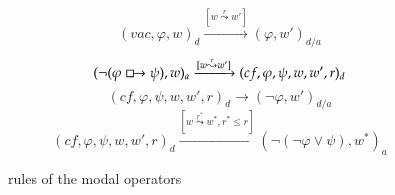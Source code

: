 \documentclass[a4paper,american]{paper}
\begin{document}
\begin{figure}[H]
\begin{equation}
	\end{equation}
	\begin{equation}
		(vac,\varphi ,w)_d\xrightarrow{[w\overset{r}{\leadsto}w']} (\varphi ,w')_{d/a}
	\end{equation}
	\begin{equation}
		(\neg (\varphi\boxright\psi ),w)_a\xrightarrow{[w\overset{r}{\leadsto}w']}(cf,\varphi ,\psi ,w,w',r)_d
	\end{equation}
	\begin{equation}
		(cf,\varphi ,\psi ,w,w',r)_d\rightarrow(\neg\varphi ,w')_{d/a}
	\end{equation}
	\begin{equation}
		(cf,\varphi ,\psi ,w,w',r)_d\xrightarrow{[w\overset{r^*}{\leadsto}w^*, r^*\leq r]}(\neg(\neg\varphi\vee\psi ),w^*)_a
	\end{equation}
	\caption{rules of the modal operators}
	\label{fig:rules}
\end{figure}
\end{document}
